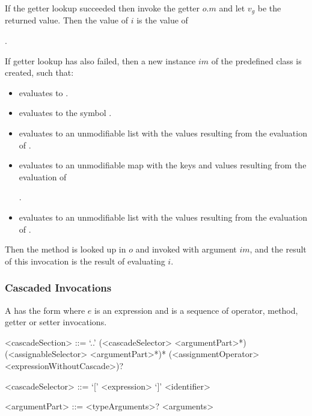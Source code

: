 \documentclass[makeidx]{article}
\begin{document}
\LMHash{}%
If the getter lookup succeeded then invoke the getter $o.m$
and let $v_g$ be the returned value.
Then the value of $i$ is the value of

.

\LMHash{}%
If getter lookup has also failed,
then a new instance $im$ of the predefined class  is created, such that:
\begin{itemize}
\item {} evaluates to \code{\TRUE{}}.
\item {} evaluates to the symbol .
\item {} evaluates to an unmodifiable list
  with the values resulting from the evaluation of
  .
\item {} evaluates to an unmodifiable map
  with the keys and values resulting from the evaluation of

  .
\item {} evaluates to an unmodifiable list
  with the values resulting from the evaluation of
  .
\end{itemize}

\LMHash{}%
Then the method  is looked up in $o$ and invoked with argument $im$,
and the result of this invocation is the result of evaluating $i$.



\subsubsection{Cascaded Invocations}

\LMHash{}%
A 
has the form 
where $e$ is an expression and  is a sequence of operator, method, getter or setter invocations.

\begin{grammar}
<cascadeSection> ::= `..' (<cascadeSelector> <argumentPart>*)
  \gnewline{} (<assignableSelector> <argumentPart>*)*
  \gnewline{} (<assignmentOperator> <expressionWithoutCascade>)?

<cascadeSelector> ::= `[' <expression> `]'
  \alt <identifier>

<argumentPart> ::=
  <typeArguments>? <arguments>
\end{grammar}
\end{document}
